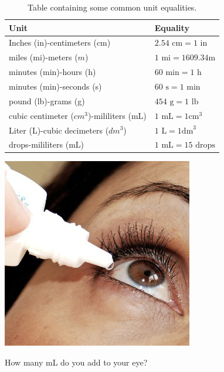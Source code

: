 \documentclass[main.tex]{subfiles}
\begin{document}
 \begin{table}[ht]
\centering
{}\selectfont
\begin{tabular}{ll}
\rowcolor{black!45}
\toprule
Unit & Equality \\
\midrule
Inches (in)-centimeters (cm)  &$2.54\text{ cm}=1\text{ in}$  \\
miles (mi)-meters ($m$)  &$1\text{ mi}=1609.34$m  \\
minutes (min)-hours (h)  &$60\text{ min}=1\text{ h}$  \\
minutes (min)-seconds (s)  &$60\text{ s}=1\text{ min}$  \\
pound (lb)-grams (g)  &$454\text{ g}=1\text{ lb}$  \\
cubic centimeter ($cm^3$)-mililiters (mL)  &$1\text{ mL}=1\text{cm}^3$  \\
Liter (L)-cubic decimeters ($dm^3$)  &$1\text{ L}=1\text{dm}^3$  \\
drops-mililiters (mL)  &$1\text{ mL}=15\text{ drops}$  \\
\bottomrule
\end{tabular}
\caption{Table containing some common unit equalities.}
\label{table1:3}
\end{table}

\begin{marginfigure}
      \includegraphics{chapter1/figure1-5}
      \caption{How many mL do you add to your eye?}
      \label{fig:marginfig5}
   \end{marginfigure}
\end{document}

